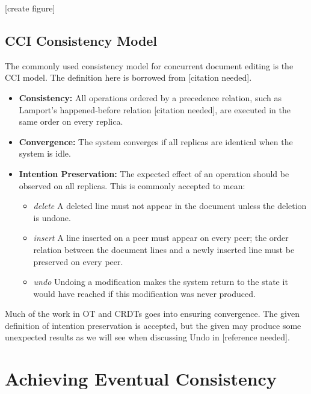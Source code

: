 \documentclass[12pt,a4paper,twoside,openright]{report}
\begin{document}
	[create figure]
	
	\subsection{CCI Consistency Model}
	The commonly used consistency model for concurrent document editing is the CCI model. The definition here is borrowed from  [citation needed].
	
	\begin{itemize}
		\item \textbf{Consistency:} All operations ordered by a precedence relation, such as Lamport’s happened-before relation [citation needed], are executed in the same order on every replica.
	
		\item \textbf{Convergence:} The system converges if all replicas are identical when the system is idle.
		
		\item \textbf{Intention Preservation:} The expected effect of an operation should be observed on all replicas. This is commonly accepted to mean:

			\begin{itemize}
				\item \textit{delete}  A deleted line must not appear in the document unless the deletion is undone.
				
				\item \textit{insert}  A line inserted on a peer must appear on every peer; the order relation between the document lines and a newly inserted line must be preserved on every peer.
				
				\item  \textit{undo}  Undoing a modification makes the system return to the state it would have reached if this modification was never produced.
				
			\end{itemize}	
		
	\end{itemize}
	
	Much of the work in OT and CRDTs goes into ensuring convergence. The given definition of intention preservation is accepted, but the given may produce some unexpected results as we will see when discussing Undo in [reference needed].
	
	
	

\section{Achieving Eventual Consistency}
\end{document}
